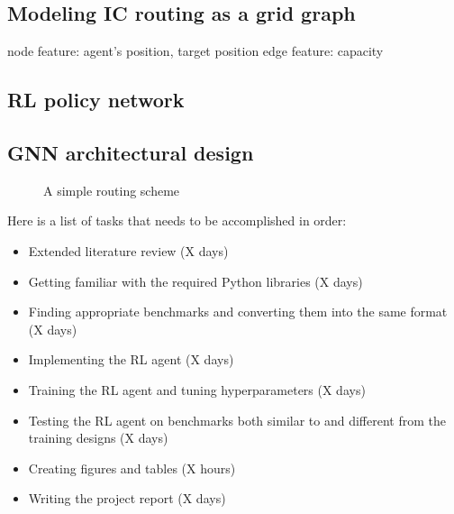 \documentclass[letterpaper]{article}
\begin{document}
\subsection{Modeling IC routing as a grid graph}
node feature: agent's position, target position
edge feature: capacity 
\subsection{RL policy network}
\subsection{GNN architectural design}



\begin{figure}[htb]
    \centering
    \fbox{\rule[-.5cm]{0cm}{4cm} \rule[-.5cm]{4cm}{0cm}}
    \caption{A simple routing scheme}
\end{figure}

Here is a list of tasks that needs to be accomplished in order:

\begin{itemize}
    \item Extended literature review (X days)
    
    \item Getting familiar with the required Python libraries (X days)
    
    \item Finding appropriate benchmarks and converting them into the same format (X days)
    
    \item Implementing the RL agent (X days)
    
    \item Training the RL agent and tuning hyperparameters (X days)
    
    \item Testing the RL agent on benchmarks both similar to and different from the training designs (X days)
    
    \item Creating figures and tables (X hours)
    
    \item Writing the project report (X days)
\end{itemize}
    
\end{document}
